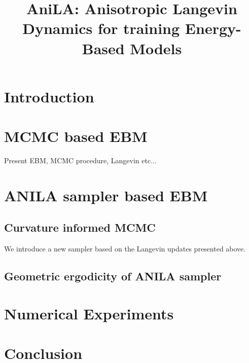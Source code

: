 \documentclass{article}
\begin{document}
\title{AniLA: Anisotropic Langevin Dynamics for training Energy-Based Models}


\date{}
\maketitle

\begin{abstract}
\end{abstract}

\section{Introduction}

\section{MCMC based EBM}

Present EBM, MCMC procedure, Langevin etc...

\section{ANILA sampler based EBM}

\subsection{Curvature informed MCMC}

We introduce a new sampler based on the Langevin updates presented above.

\subsection{Geometric ergodicity of ANILA sampler}

\section{Numerical Experiments}


\section{Conclusion}

\newpage






\end{document}
